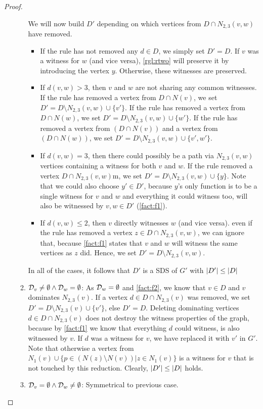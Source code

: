 \begin{proof}
\begin{enumerate}
\begin{enumerate}
            We will now build $D'$ depending on which vertices from $D \cap N_{2,3}(v,w)$ have removed. 
            \begin{itemize}
                \item If the rule has not removed any $d \in D$, we simply set $D' = D$. If $v$ was a witness for $w$ (and vice versa), \cref{rgl:rtwo} will preserve it by introducing the vertex $y$. Otherwise, these witnesses are preserved.
                \item If $d(v,w) > 3$, then $v$ and $w$ are not sharing any common witnesses. 
                If the rule has removed a vertex from $D \cap N(v)$, we set $D' = D \setminus N_{2,3}(v,w) \cup \{v'\}$.
                If the rule has removed a vertex from $D \cap N(w)$, we  set $D' = D \setminus N_{2,3}(v,w) \cup \{w'\}$.
                If the rule has removed a vertex from $(D \cap N(v))$ and a vertex from $(D \cap N(w))$, we set $D' = D \setminus N_{2,3}(v,w) \cup \{v', w'\}$.
                \item If $d(v,w) = 3$, then there could possibly be a path via $N_{2,3}(v,w) $ vertices containing a witness for both $v$ and $w$. If the rule removed a vertex $D \cap N_{2,3}(v, w)$m, we set $D' = D \setminus N_{2,3}(v,w) \cup \{y\}$. Note that we could also choose $y' \in D'$, because $y$'s only function is to be a single witness for $v$ and $w$ and everything it could witness too, will also be witnessed by $v,w \in D'$ (\cref{fact:f1}).
                \item If $d(v,w) \leq 2$, then $v$ directly witnesses $w$ (and vice versa). even if the rule has removed a vertex $z \in D \cap N_{2,3}(v,w)$, we can ignore that, because \cref{fact:f1} states that $v$ and $w$ will witness the same vertices as $z$ did. Hence, we set $D' = D \setminus N_{2,3}(v,w)$.
            \end{itemize}
            In all of the cases, it follows that $D'$ is a SDS of $G'$ with $\abs{D'} \leq \abs{D}$ 
            
            \item  $ \mathcal{D}_{v} \neq \emptyset  \wedge \mathcal{D}_{w} = \emptyset$: As $\mathcal{D}_{w} = \emptyset$ and \cref{fact:f2}, we know that $v \in D$ and $v$ dominates $N_{2,3}(v)$. 
            If a vertex $d \in D \cap N_{2,3}(v)$ was removed, we set $D' = D \setminus N_{2,3}(v) \cup \{v'\}$, else $D' = D$.
            Deleting dominating vertices $d \in D \cap N_{2,3}(v)$ does not destroy the witness properties of the graph, because by \cref{fact:f1} we know that everything $d$ could witness, is also witnessed by $v$. 
            If $d$ was a witness for $v$, we have replaced it with $v'$ in $G'$.
            Note that otherwise a vertex from $N_1(v) \cup \{ p \in (N(z) \setminus N(v)) | z \in N_1(v) \}$ is a witness for $v$ that is not touched by this reduction. Clearly, $\abs{D'} \leq \abs{D}$ holds.
            \item  $ \mathcal{D}_{v} = \emptyset  \wedge \mathcal{D}_{w} \neq  \emptyset $: Symmetrical to previous case.
        \end{enumerate}


\end{enumerate}
\end{proof}

